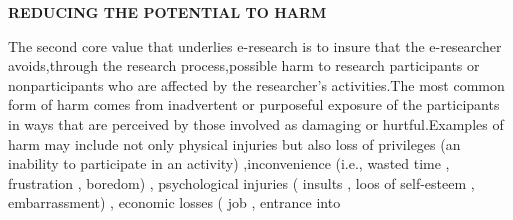 \documentclass[10pt,a4paper]{book}
\begin{document}
\begin{flushleft}
  \textbf{\!\!\!\!\!\!\!\!\!\!\!\!\!\!\!\!\!\!\!\!REDUCING THE POTENTIAL TO HARM}
\end{flushleft}

\!\!\!\!\!\!\!\!\!\!The second core value that underlies e-research is to insure that the e-researcher avoids,through the research process,possible harm to research participants or nonparticipants who are affected by the researcher's activities.The most common form of harm comes from inadvertent or purposeful exposure of the participants in ways that are perceived by those involved as damaging or hurtful.Examples of harm may include not only physical injuries but also loss of privileges (an inability to participate in an activity) ,inconvenience (i.e., wasted time , frustration , boredom) , psychological injuries ( insults , loos of self-esteem , embarrassment) , economic losses ( job , entrance into
\end{document}
